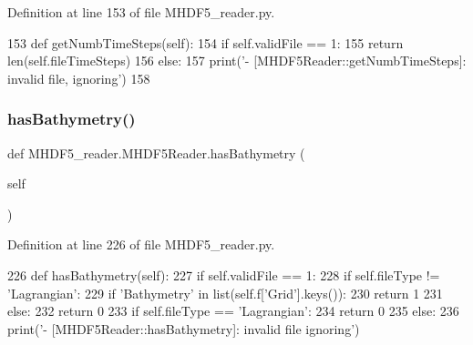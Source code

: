 Definition at line 153 of file M\+H\+D\+F5\+\_\+reader.\+py.


\begin{DoxyCode}
153     \textcolor{keyword}{def }getNumbTimeSteps(self):
154         \textcolor{keywordflow}{if} self.validFile == 1:
155             \textcolor{keywordflow}{return} len(self.fileTimeSteps)
156         \textcolor{keywordflow}{else}:
157             print(\textcolor{stringliteral}{'- [MHDF5Reader::getNumbTimeSteps]: invalid file, ignoring'})
158     
\end{DoxyCode}
\mbox{\label{class_m_h_d_f5__reader_1_1_m_h_d_f5_reader_a7e1fc985528e18756f46dd9d31bc6530}} 
\subsubsection{\texorpdfstring{has\+Bathymetry()}{hasBathymetry()}}
{\footnotesize\ttfamily def M\+H\+D\+F5\+\_\+reader.\+M\+H\+D\+F5\+Reader.\+has\+Bathymetry (\begin{DoxyParamCaption}\item[{}]{self }\end{DoxyParamCaption})}



Definition at line 226 of file M\+H\+D\+F5\+\_\+reader.\+py.


\begin{DoxyCode}
226     \textcolor{keyword}{def }hasBathymetry(self):
227         \textcolor{keywordflow}{if} self.validFile == 1:            
228             \textcolor{keywordflow}{if} self.fileType != \textcolor{stringliteral}{'Lagrangian'}:
229                 \textcolor{keywordflow}{if} \textcolor{stringliteral}{'Bathymetry'} \textcolor{keywordflow}{in} list(self.f[\textcolor{stringliteral}{'Grid'}].keys()):
230                     \textcolor{keywordflow}{return} 1
231                 \textcolor{keywordflow}{else}:
232                     \textcolor{keywordflow}{return} 0
233             \textcolor{keywordflow}{if} self.fileType == \textcolor{stringliteral}{'Lagrangian'}:
234                 \textcolor{keywordflow}{return} 0
235         \textcolor{keywordflow}{else}:
236             print(\textcolor{stringliteral}{'- [MHDF5Reader::hasBathymetry]: invalid file ignoring'})
\end{DoxyCode}
\mbox{\label{class_m_h_d_f5__reader_1_1_m_h_d_f5_reader_a6f95078ac94bea3283223688091854d5}} 
